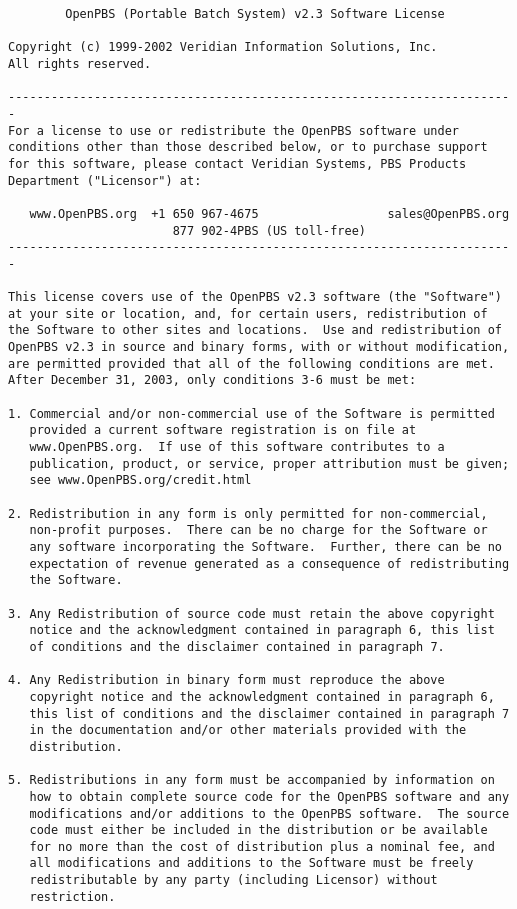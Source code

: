 \begin{verbatim}
        OpenPBS (Portable Batch System) v2.3 Software License

Copyright (c) 1999-2002 Veridian Information Solutions, Inc.
All rights reserved.

-----------------------------------------------------------------------
For a license to use or redistribute the OpenPBS software under
conditions other than those described below, or to purchase support
for this software, please contact Veridian Systems, PBS Products
Department ("Licensor") at:

   www.OpenPBS.org  +1 650 967-4675                  sales@OpenPBS.org
                       877 902-4PBS (US toll-free)
-----------------------------------------------------------------------

This license covers use of the OpenPBS v2.3 software (the "Software")
at your site or location, and, for certain users, redistribution of
the Software to other sites and locations.  Use and redistribution of
OpenPBS v2.3 in source and binary forms, with or without modification,
are permitted provided that all of the following conditions are met.
After December 31, 2003, only conditions 3-6 must be met:

1. Commercial and/or non-commercial use of the Software is permitted
   provided a current software registration is on file at
   www.OpenPBS.org.  If use of this software contributes to a
   publication, product, or service, proper attribution must be given;
   see www.OpenPBS.org/credit.html

2. Redistribution in any form is only permitted for non-commercial,
   non-profit purposes.  There can be no charge for the Software or
   any software incorporating the Software.  Further, there can be no
   expectation of revenue generated as a consequence of redistributing
   the Software.

3. Any Redistribution of source code must retain the above copyright
   notice and the acknowledgment contained in paragraph 6, this list
   of conditions and the disclaimer contained in paragraph 7.

4. Any Redistribution in binary form must reproduce the above
   copyright notice and the acknowledgment contained in paragraph 6,
   this list of conditions and the disclaimer contained in paragraph 7
   in the documentation and/or other materials provided with the
   distribution.

5. Redistributions in any form must be accompanied by information on
   how to obtain complete source code for the OpenPBS software and any
   modifications and/or additions to the OpenPBS software.  The source
   code must either be included in the distribution or be available
   for no more than the cost of distribution plus a nominal fee, and
   all modifications and additions to the Software must be freely
   redistributable by any party (including Licensor) without
   restriction.


\end{verbatim}
